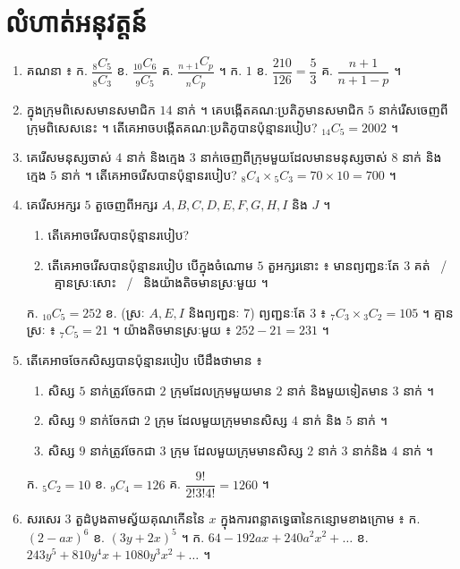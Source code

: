 \section*{លំហាត់អនុវត្តន៍}
\begin{enumerate}[1]
  \item គណនា ៖ \quad ក. $\dfrac{{}_8C_5}{{}_8C_3}$ \quad ខ. $\dfrac{{}_{10}C_6}{{}_9C_5}$ \quad គ. $\dfrac{{}_{n+1}C_p}{{}_nC_p}$ ។
  \ans
  ក. $1$ \quad ខ. $\dfrac{210}{126} = \dfrac{5}{3}$ \quad គ. $\dfrac{n + 1}{n + 1 - p}$ ។
  \item ក្នុងក្រុមពិសេសមានសមាជិក $14$ នាក់ ។ គេបង្កើតគណៈប្រតិភូមានសមាជិក $5$ នាក់រើសចេញពីក្រុមពិសេសនេះ ។ តើគេអាចបង្កើតគណៈប្រតិភូបានប៉ុន្មានរបៀប?
  \ans
  ${}_{14}C_5 = 2002$ ។
  \item គេរើសមនុស្សចាស់ $4$ នាក់ និងក្មេង $3$ នាក់ចេញពីក្រុមមួយដែលមានមនុស្សចាស់ $8$ នាក់ និងក្មេង $5$ នាក់ ។ តើគេអាចរើសបានប៉ុន្មានរបៀប?
  \ans
  ${}_8C_4\times{}_5C_3 = 70\times 10 = 700$ ។
  \item គេរើសអក្សរ $5$ តួចេញពីអក្សរ $A, B, C, D, E, F, G, H, I$ និង $J$ ។
  \begin{enumerate}[a]
    \item តើគេអាចរើសបានប៉ុន្មានរបៀប?
    \item តើគេអាចរើសបានប៉ុន្មានរបៀប បើក្នុងចំណោម $5$ តួអក្សរនោះ ៖ មានព្យញ្ជនៈតែ $3$ គត់ \ / \ គ្មានស្រៈសោះ \ / \ និងយ៉ាងតិចមានស្រៈមួយ ។
  \end{enumerate}
  \ans
  ក. ${}_{10}C_5 = 252$ \quad ខ. (ស្រៈ $A, E, I$ និងព្យញ្ជនៈ $7$) ព្យញ្ជនៈតែ $3$ ៖ ${}_7C_3\times{}_3C_2 = 105$ ។ គ្មានស្រៈ ៖ ${}_7C_5 = 21$ ។ យ៉ាងតិចមានស្រៈមួយ ៖ $252 - 21 = 231$ ។
  \item តើគេអាចចែកសិស្សបានប៉ុន្មានរបៀប បើដឹងថាមាន ៖
  \begin{enumerate}[a]
    \item សិស្ស $5$ នាក់ត្រូវចែកជា $2$ ក្រុមដែលក្រុមមួយមាន $2$ នាក់ និងមួយទៀតមាន $3$ នាក់ ។
    \item សិស្ស $9$ នាក់ចែកជា $2$ ក្រុម ដែលមួយក្រុមមានសិស្ស $4$ នាក់ និង $5$ នាក់ ។
    \item សិស្ស $9$ នាក់ត្រូវចែកជា $3$ ក្រុម ដែលមួយក្រុមមានសិស្ស $2$ នាក់ $3$ នាក់និង $4$ នាក់ ។
  \end{enumerate}
  \ans
  ក. ${}_5C_2 = 10$ \quad ខ. ${}_9C_4 = 126$ \quad គ. $\dfrac{9!}{2!3!4!} = 1260$ ។
  \item សរសេរ $3$ តួដំបូងតាមស្វ័យគុណកើននៃ $x$ ក្នុងការពន្លាតទ្វេធានៃកន្សោមខាងក្រោម ៖ \quad ក. $(2 - ax)^6$ \quad ខ. $(3y + 2x)^5$ ។
  \ans
  ក. $64 - 192ax + 240a^2x^2 + \dots$ \quad ខ. $243y^5 + 810y^4x + 1080y^3x^2 + \dots$ ។

\end{enumerate}
